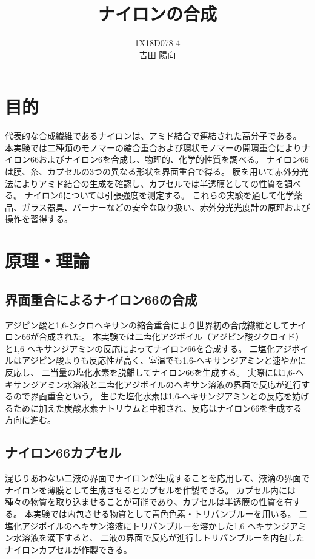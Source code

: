\documentclass[11pt]{jsarticle}
\begin{document}
\title{ナイロンの合成}
\author{1X18D078-4 \\ 吉田 陽向}
\maketitle
\newpage
\section{目的}
代表的な合成繊維であるナイロンは、アミド結合で連結された高分子である。
本実験では二種類のモノマーの縮合重合および環状モノマーの開環重合によりナイロン66およびナイロン6を合成し、物理的、化学的性質を調べる。
ナイロン66は膜、糸、カプセルの3つの異なる形状を界面重合で得る。
膜を用いて赤外分光法によりアミド結合の生成を確認し、カプセルでは半透膜としての性質を調べる。
ナイロン6については引張強度を測定する。
これらの実験を通して化学薬品、ガラス器具、バーナーなどの安全な取り扱い、赤外分光光度計の原理および操作を習得する。
\section{原理・理論}
\subsection{界面重合によるナイロン66の合成}
アジピン酸と1,6-シクロヘキサンの縮合重合により世界初の合成繊維としてナイロン66が合成された。
本実験では二塩化アジポイル（アジピン酸ジクロイド）と1,6-ヘキサンジアミンの反応によってナイロン66を合成する。
二塩化アジポイルはアジピン酸よりも反応性が高く、室温でも1,6-ヘキサンジアミンと速やかに反応し、
二当量の塩化水素を脱離してナイロン66を生成する。
実際には1,6-ヘキサンジアミン水溶液と二塩化アジポイルのヘキサン溶液の界面で反応が進行するので界面重合という。
生じた塩化水素は1,6-ヘキサンジアミンとの反応を妨げるために加えた炭酸水素ナトリウムと中和され、反応はナイロン66を生成する方向に進む。
\subsection{ナイロン66カプセル}
混じりあわない二液の界面でナイロンが生成することを応用して、液滴の界面でナイロンを薄膜として生成させるとカプセルを作製できる。
カプセル内には種々の物質を取り込ませることが可能であり、カプセルは半透膜の性質を有する。
本実験では内包させる物質として青色色素・トリパンブルーを用いる。
二塩化アジポイルのヘキサン溶液にトリパンブルーを溶かした1,6-ヘキサンジアミン水溶液を滴下すると、
二液の界面で反応が進行しトリパンブルーを内包したナイロンカプセルが作製できる。
\end{document}
